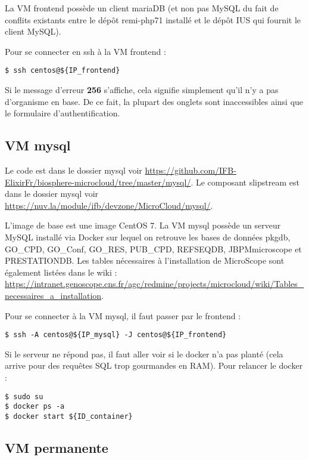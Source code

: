 La VM frontend possède un client mariaDB (et non pas MySQL du fait de conflits existants entre le dépôt remi-php71 installé et le dépôt IUS qui fournit le client MySQL).\newline

Pour se connecter en ssh à la VM frontend : 
\begin{lstlisting}[style=Bash]
$ ssh centos@${IP_frontend}
\end{lstlisting}

\begin{mycolorbox}Si le message d’erreur \textbf{256} s’affiche, cela signifie simplement qu’il n’y a pas d’organisme en base. De ce fait, la plupart des onglets sont inaccessibles ainsi que le formulaire d’authentification.
\end{mycolorbox}

\subsection {VM mysql}\label{mysql}

Le code est dans le dossier mysql voir \url{https://github.com/IFB-ElixirFr/biosphere-microcloud/tree/master/mysql/}.
Le composant slipstream est dans le dossier mysql voir \url{https://nuv.la/module/ifb/devzone/MicroCloud/mysql/}.

L'image de base est une image CentOS 7. La VM mysql possède un serveur MySQL installé via Docker sur lequel on retrouve les bases de données pkgdb, GO\_CPD, GO\_Conf, GO\_RES, PUB\_CPD, REFSEQDB, JBPMmicroscope et PRESTATIONDB. Les tables nécessaires à l'installation de MicroScope sont également listées dans le wiki : \url{https://intranet.genoscope.cns.fr/agc/redmine/projects/microcloud/wiki/Tables_necessaires_a_installation}.
\newline

Pour se connecter à la VM mysql, il faut passer par le frontend :
\begin{lstlisting}[style=bash]
$ ssh -A centos@${IP_mysql} -J centos@${IP_frontend}
\end{lstlisting}
\bigskip

Si le serveur ne répond pas, il faut aller voir si le docker n'a pas planté (cela arrive pour des requêtes SQL trop gourmandes en RAM).
Pour relancer le docker :
\begin{lstlisting}[style=bash]
$ sudo su
$ docker ps -a
$ docker start ${ID_container}
\end{lstlisting}

\subsection {VM permanente}\label{VMpermanente}

